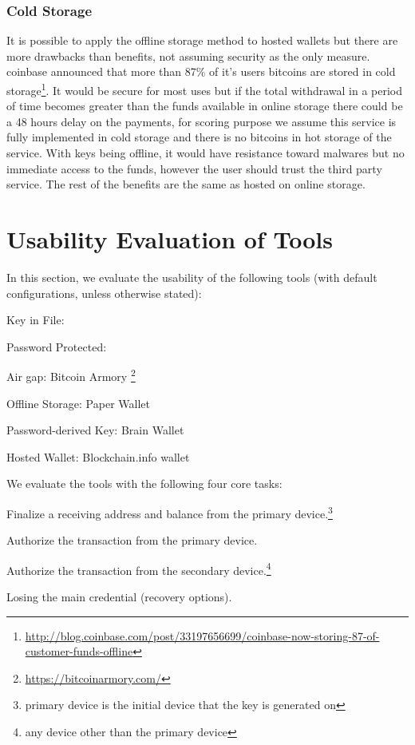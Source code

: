 \subsubsection{Cold Storage} 
It is possible to apply the offline storage method to hosted wallets but there are more drawbacks than benefits, not assuming security as the only measure. coinbase announced that more than 87\% of it's users bitcoins are stored in cold storage\footnote{\url {http://blog.coinbase.com/post/33197656699/coinbase-now-storing-87-of-customer-funds-offline}}. It would be secure for most uses but if the total withdrawal in a period of time becomes greater than the funds available in online storage there could be a 48 hours delay on the payments, for scoring purpose we assume this service is fully implemented in cold storage and there is no bitcoins in hot storage of the service.
With keys being offline, it would have resistance toward malwares but no immediate access to the funds, however the user should trust the third party service. The rest of the benefits are the same as hosted on online storage.



\section{Usability Evaluation of Tools}

In this section, we evaluate the usability of the following tools (with default configurations, unless otherwise stated):

\begin{compactlist}
	\item[\bf 1] Key in File:  \bitcoinclient 
	\item[\bf 2] Password Protected: \multibit 
	\item[\bf 3] Air gap: Bitcoin Armory \footnote{\url{https://bitcoinarmory.com/}}
	\item[\bf 4] Offline Storage: Paper Wallet
	\item[\bf 5] Password-derived Key: Brain Wallet
	\item[\bf 6] Hosted Wallet: Blockchain.info wallet
\end{compactlist}

We evaluate the tools with the following four core tasks:

\begin{compactlist}
	\item[\bf T1] Finalize a receiving address and balance from the primary device.\footnote{primary device is the initial device that the key is generated on}\label{sec:ct-1}
	\item[\bf T2] Authorize the transaction from the primary device.\label{sec:ct-2}
	\item[\bf T3] Authorize the transaction from the secondary device.\footnote{any device other than the primary device}\label{sec:ct-2}
	\item[\bf T4] Losing the main credential (recovery options).\label{sec:ct-2}
\end{compactlist}

